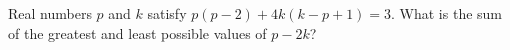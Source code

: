 Real numbers $p$ and $k$ satisfy $p(p-2)+4k(k-p+1)=3$. What is the sum of the greatest and least possible values of $p-2k$?
